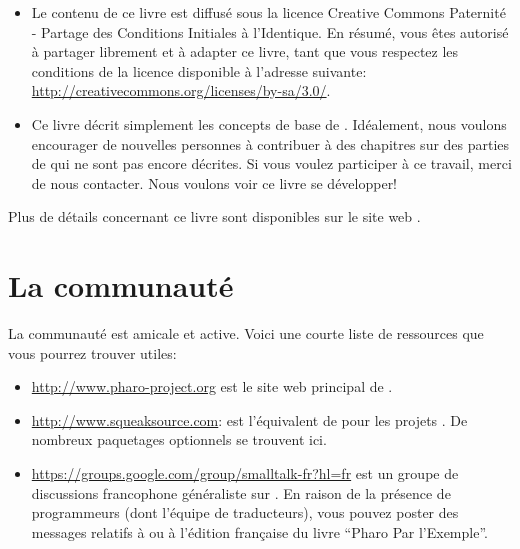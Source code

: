 \documentclass[a4paper,10pt,twoside]{book}
\begin{document}
\begin{itemize}

\item	Le contenu de ce livre est diffusé sous la licence Creative Commons Paternité - Partage des Conditions Initiales à l'Identique.
		En résumé, vous êtes autorisé à partager librement et à adapter ce livre, tant que vous respectez les conditions de la licence disponible à l'adresse suivante: 
		\url{http://creativecommons.org/licenses/by-sa/3.0/}.

\item	Ce livre décrit simplement les concepts de base de \pharo.
		Idéalement, nous voulons encourager de nouvelles personnes à contribuer à des chapitres sur des parties de \pharo qui ne sont pas encore décrites.
		Si vous voulez participer à ce travail, merci de nous contacter. Nous voulons voir ce livre se développer!
\end{itemize}

Plus de détails concernant ce livre sont disponibles sur le site web \mbox{\ppe.}

\section*{La communauté \pharo}

La communauté \pharo est amicale et active.
Voici une courte liste de ressources que vous pourrez trouver utiles:

\begin{itemize}
\item \url{http://www.pharo-project.org} est le site web principal de \pharo.
\item \url{http://www.squeaksource.com}: \squeaksource est l'équivalent de
  \sourceforge pour les projets \pharo. De nombreux paquetages optionnels se trouvent ici.
\item \url{https://groups.google.com/group/smalltalk-fr?hl=fr} est un groupe de discussions francophone généraliste sur \st{}. En raison de la présence de programmeurs \pharo{} (dont l'équipe de traducteurs), vous pouvez poster des messages relatifs à \pharo{} ou à l'édition française du livre ``Pharo Par l'Exemple''.
\end{itemize}

\end{document}
